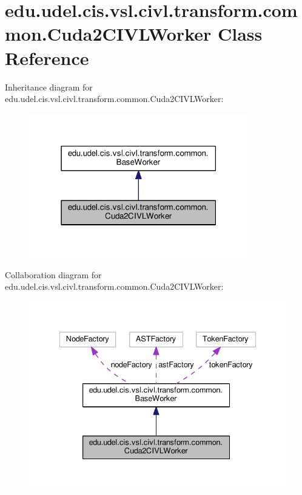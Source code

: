 \hypertarget{classedu_1_1udel_1_1cis_1_1vsl_1_1civl_1_1transform_1_1common_1_1Cuda2CIVLWorker}{}\section{edu.\+udel.\+cis.\+vsl.\+civl.\+transform.\+common.\+Cuda2\+C\+I\+V\+L\+Worker Class Reference}
\label{classedu_1_1udel_1_1cis_1_1vsl_1_1civl_1_1transform_1_1common_1_1Cuda2CIVLWorker}


Inheritance diagram for edu.\+udel.\+cis.\+vsl.\+civl.\+transform.\+common.\+Cuda2\+C\+I\+V\+L\+Worker\+:
\nopagebreak
\begin{figure}[H]
\begin{center}
\leavevmode
\includegraphics[width=271pt]{classedu_1_1udel_1_1cis_1_1vsl_1_1civl_1_1transform_1_1common_1_1Cuda2CIVLWorker__inherit__graph}
\end{center}
\end{figure}


Collaboration diagram for edu.\+udel.\+cis.\+vsl.\+civl.\+transform.\+common.\+Cuda2\+C\+I\+V\+L\+Worker\+:
\nopagebreak
\begin{figure}[H]
\begin{center}
\leavevmode
\includegraphics[width=335pt]{classedu_1_1udel_1_1cis_1_1vsl_1_1civl_1_1transform_1_1common_1_1Cuda2CIVLWorker__coll__graph}
\end{center}
\end{figure}
